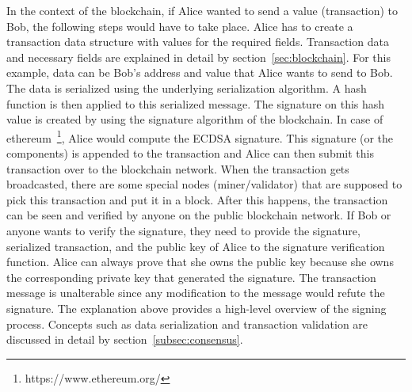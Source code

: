 In the context of the blockchain, if Alice wanted to send a value (transaction)
to Bob, the following steps would have to take place. Alice has to create a
transaction data structure with values for the required fields. Transaction
data and necessary fields are explained in detail by
section~\ref{sec:blockchain}. For this example, data can be Bob's address and
value that Alice wants to send to Bob. The data is serialized using the
underlying serialization algorithm. A hash function is then applied to this
serialized message. The signature on this hash value is created by using the
signature algorithm of the blockchain. In case of
ethereum~\footnote{https://www.ethereum.org/}, Alice would compute the ECDSA
signature. This signature (or the components) is appended to the transaction
and Alice can then submit this transaction over to the blockchain network. When
the transaction gets broadcasted, there are some special nodes
(miner/validator) that are supposed to pick this transaction and put it in a
block. After this happens, the transaction can be seen and verified by anyone
on the public blockchain network. If Bob or anyone wants to verify the
signature, they need to provide the signature, serialized transaction, and the
public key of Alice to the signature verification function. Alice can always
prove that she owns the public key because she owns the corresponding private
key that generated the signature. The transaction message is unalterable since
any modification to the message would refute the signature.  The explanation
above provides a high-level overview of the signing process.  Concepts such as
data serialization and transaction validation are discussed in detail by
section~\ref{subsec:consensus}.

